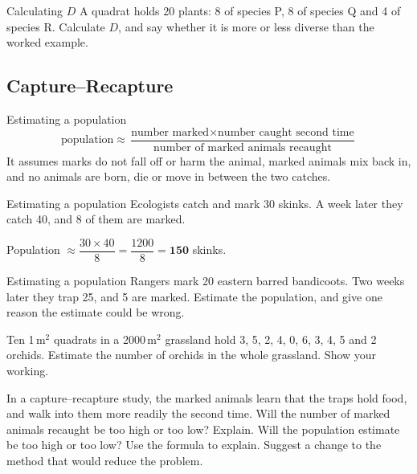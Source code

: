 \begin{wedo}{Calculating $D$}
A quadrat holds 20 plants: 8 of species P, 8 of species Q and 4 of species R. Calculate $D$, and say whether it is more or less diverse than the worked example.
\workbox{5cm}
\end{wedo}

\subsection{Capture--Recapture}\label{sub:a4.2}

\begin{skillbox}{Estimating a population}
\[ \text{population} \approx \frac{\text{number marked} \times \text{number caught second time}}{\text{number of marked animals recaught}} \]
It assumes marks do not fall off or harm the animal, marked animals mix back in, and no animals are born, die or move in between the two catches.
\end{skillbox}

\begin{workedex}{Estimating a population}
Ecologists catch and mark 30 skinks. A week later they catch 40, and 8 of them are marked.

\smallskip
Population $\approx \dfrac{30 \times 40}{8} = \dfrac{1200}{8} = \mathbf{150}$ skinks.
\end{workedex}

\begin{wedo}{Estimating a population}
Rangers mark 20 eastern barred bandicoots. Two weeks later they trap 25, and 5 are marked. Estimate the population, and give one reason the estimate could be wrong.
\workbox{5cm}
\end{wedo}

\label{prac:4}


\task Ten 1\,m$^2$ quadrats in a 2000\,m$^2$ grassland hold 3, 5, 2, 4, 0, 6, 3, 4, 5 and 2 orchids. Estimate the number of orchids in the whole grassland. Show your working.
\workbox{5cm}

\label{ext:4}

\task In a capture--recapture study, the marked animals learn that the traps hold food, and walk into them more readily the second time.
 Will the number of marked animals recaught be too high or too low? Explain.
\answerbox{3.5cm}
 Will the population estimate be too high or too low? Use the formula to explain.
\answerbox{3.5cm}
 Suggest a change to the method that would reduce the problem.
\answerbox{3cm}


